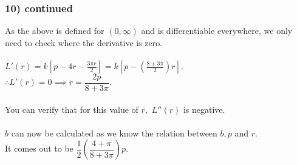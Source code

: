 \documentclass[handout]{beamer}
\begin{document}
\begin{frame}
    \frametitle{10) continued}
    As the above is defined for $(0, \infty)$ and is differentiable everywhere, we only need to check where the derivative is zero.\\~\\
	$L'(r) = k\left[p - 4r - \frac{3\pi r}{2}\right] = k\left[p - \left(\frac{8 + 3\pi}{2}\right)r\right] .$\\
	$\therefore L'(r) = 0 \implies r = \dfrac{2p}{8 + 3\pi}.$\\~\\
	You can verify that for this value of $r,$ $L''(r)$ is negative. \\~\\
	$b$ can now be calculated as we know the relation between $b, p$ and $r.$\\
	It comes out to be $\dfrac{1}{2}\left(\dfrac{4 + \pi}{8 + 3\pi}\right)p.$
\end{frame}




\end{document}
